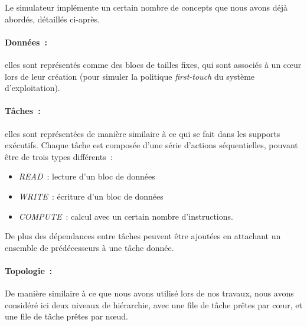 Le simulateur implémente un certain nombre de concepts que nous avons déjà abordés, détaillés ci-après.


\paragraph{Données~:} elles sont représentés comme des blocs de tailles fixes, qui sont associés à un cœur lors de leur création (pour simuler la politique \emph{first-touch} du système d'exploitation).

\paragraph{Tâches~:} elles sont représentées de manière similaire à ce qui se fait dans les supports exécutifs.
Chaque tâche est composée d'une série d'actions séquentielles, pouvant être de trois types différents~:
\begin{itemize}
  \item \emph{READ}~: lecture d'un bloc de données
  \item \emph{WRITE}~: écriture d'un bloc de données
  \item \emph{COMPUTE}~: calcul avec un certain nombre d'instructions.
\end{itemize}

De plus des dépendances entre tâches peuvent être ajoutées en attachant un ensemble de prédécesseurs à une tâche donnée.

\paragraph{Topologie~:}
De manière similaire à ce que nous avons utilisé lors de nos travaux, nous avons considéré ici deux niveaux de hiérarchie, avec une file de tâche prêtes par cœur, et une file de tâche prêtes par nœud.

